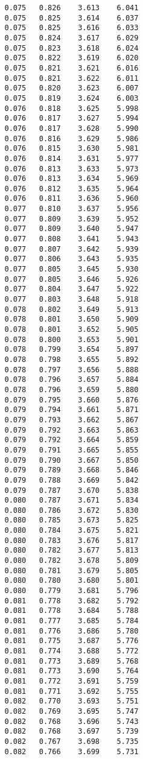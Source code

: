 \begin{verbatim}
   0.075   0.826    3.613    6.041
   0.075   0.825    3.614    6.037
   0.075   0.825    3.616    6.033
   0.075   0.824    3.617    6.029
   0.075   0.823    3.618    6.024
   0.075   0.822    3.619    6.020
   0.075   0.821    3.621    6.016
   0.075   0.821    3.622    6.011
   0.075   0.820    3.623    6.007
   0.075   0.819    3.624    6.003
   0.076   0.818    3.625    5.998
   0.076   0.817    3.627    5.994
   0.076   0.817    3.628    5.990
   0.076   0.816    3.629    5.986
   0.076   0.815    3.630    5.981
   0.076   0.814    3.631    5.977
   0.076   0.813    3.633    5.973
   0.076   0.813    3.634    5.969
   0.076   0.812    3.635    5.964
   0.076   0.811    3.636    5.960
   0.077   0.810    3.637    5.956
   0.077   0.809    3.639    5.952
   0.077   0.809    3.640    5.947
   0.077   0.808    3.641    5.943
   0.077   0.807    3.642    5.939
   0.077   0.806    3.643    5.935
   0.077   0.805    3.645    5.930
   0.077   0.805    3.646    5.926
   0.077   0.804    3.647    5.922
   0.077   0.803    3.648    5.918
   0.078   0.802    3.649    5.913
   0.078   0.801    3.650    5.909
   0.078   0.801    3.652    5.905
   0.078   0.800    3.653    5.901
   0.078   0.799    3.654    5.897
   0.078   0.798    3.655    5.892
   0.078   0.797    3.656    5.888
   0.078   0.796    3.657    5.884
   0.078   0.796    3.659    5.880
   0.079   0.795    3.660    5.876
   0.079   0.794    3.661    5.871
   0.079   0.793    3.662    5.867
   0.079   0.792    3.663    5.863
   0.079   0.792    3.664    5.859
   0.079   0.791    3.665    5.855
   0.079   0.790    3.667    5.850
   0.079   0.789    3.668    5.846
   0.079   0.788    3.669    5.842
   0.079   0.787    3.670    5.838
   0.080   0.787    3.671    5.834
   0.080   0.786    3.672    5.830
   0.080   0.785    3.673    5.825
   0.080   0.784    3.675    5.821
   0.080   0.783    3.676    5.817
   0.080   0.782    3.677    5.813
   0.080   0.782    3.678    5.809
   0.080   0.781    3.679    5.805
   0.080   0.780    3.680    5.801
   0.080   0.779    3.681    5.796
   0.081   0.778    3.682    5.792
   0.081   0.778    3.684    5.788
   0.081   0.777    3.685    5.784
   0.081   0.776    3.686    5.780
   0.081   0.775    3.687    5.776
   0.081   0.774    3.688    5.772
   0.081   0.773    3.689    5.768
   0.081   0.773    3.690    5.764
   0.081   0.772    3.691    5.759
   0.081   0.771    3.692    5.755
   0.082   0.770    3.693    5.751
   0.082   0.769    3.695    5.747
   0.082   0.768    3.696    5.743
   0.082   0.768    3.697    5.739
   0.082   0.767    3.698    5.735
   0.082   0.766    3.699    5.731

\end{verbatim}
